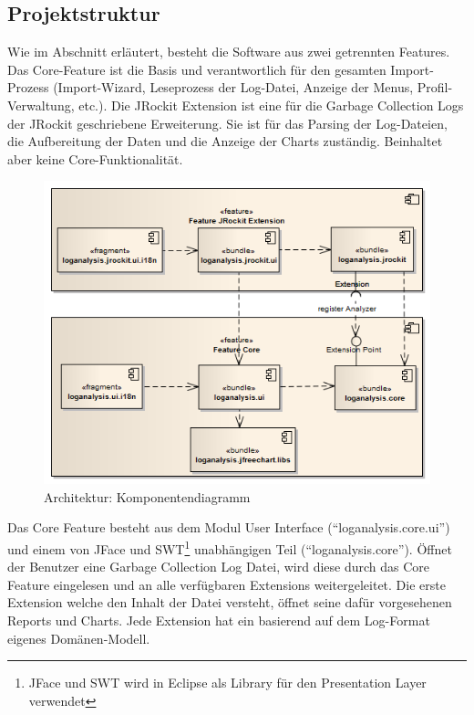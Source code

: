 \subsection{Projektstruktur}\label{projektstruktur}
Wie im Abschnitt  erläutert, besteht die Software aus zwei getrennten Features. Das Core-Feature ist die Basis und verantwortlich für den gesamten Import-Prozess (Import-Wizard, Leseprozess der Log-Datei, Anzeige der Menus, Profil-Verwaltung, etc.). Die JRockit Extension ist eine für die Garbage Collection Logs der JRockit geschriebene Erweiterung. Sie ist für das Parsing der Log-Dateien, die Aufbereitung der Daten und die Anzeige der Charts zuständig. Beinhaltet aber keine Core-Funktionalität.
 \begin{figure}[H]
  	\centering
    	\includegraphics[width=14cm]{images/architektur_komponenten_uebersicht}
        	\caption{Architektur: Komponentendiagramm}
\end{figure}

Das Core Feature besteht aus dem Modul User Interface (``loganalysis.core.ui'') und einem von JFace und SWT\footnote{JFace und SWT wird in Eclipse als Library für den Presentation Layer verwendet} unabhängigen Teil (``loganalysis.core''). Öffnet der Benutzer eine Garbage Collection Log Datei, wird diese durch das Core Feature eingelesen und an alle verfügbaren Extensions weitergeleitet. Die erste Extension welche den Inhalt der Datei versteht, öffnet seine dafür vorgesehenen Reports und Charts. Jede Extension hat ein basierend auf dem Log-Format eigenes Domänen-Modell.

